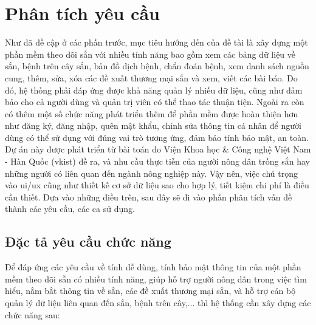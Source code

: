 \documentclass[./../main.tex]{subfiles}
\begin{document}
\section{Phân tích yêu cầu}
Như đã đề cập ở các phần trước, mục tiêu hướng đến của đề tài là xây dựng một phần mềm theo dõi sắn với nhiều tính năng bao gồm xem các bảng dữ liệu về sắn, bệnh trên cây sắn, bản đồ dịch bệnh, chẩn đoán bệnh, xem danh sách nguồn cung, thêm, sửa, xóa các đề xuất thương mại sắn và xem, viết các bài báo. Do đó, hệ thống phải đáp ứng được khả năng quản lý nhiều dữ liệu, cũng như đảm bảo cho cả người dùng và quản trị viên có thể thao tác thuận tiện. Ngoài ra còn có thêm một số chức năng phát triển thêm để phần mềm được hoàn thiện hơn như đăng ký, đăng nhập, quên mật khẩu, chỉnh sửa thông tin cá nhân để người dùng có thể sử dụng với đúng vai trò tương ứng, đảm bảo tính bảo mật, an toàn. Dự án này được phát triển từ bài toán do Viện Khoa học \& Công nghệ Việt Nam - Hàn Quốc (\acrshort{vkist}) đề ra, và nhu cầu thực tiễn của người nông dân trồng sắn hay những người có liên quan đến ngành nông nghiệp này. Vậy nên, việc chú trọng vào \acrshort{ui}/\acrshort{ux} cũng như thiết kế cơ sở dữ liệu sao cho hợp lý, tiết kiệm chi phí là điều cần thiết. Dựa vào những điều trên, sau đây sẽ đi vào phần phân tích vấn đề thành các yêu cầu, các ca sử dụng.

\subsection{Đặc tả yêu cầu chức năng}
Để đáp ứng các yêu cầu về tính dễ dùng, tính bảo mật thông tin của một phần mềm theo dõi sẵn có nhiều tính năng, giúp hỗ trợ người nông dân trong việc tìm hiểu, nắm bắt thông tin về sắn, các đề xuất thương mại sắn, và hỗ trợ cán bộ quản lý dữ liệu liên quan đến sắn, bệnh trên cây,... thì hệ thống cần xây dựng các chức năng sau:
\end{document}
